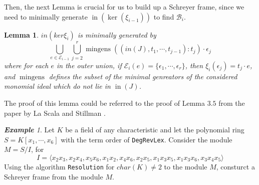 \documentclass{article}
\newtheorem{lemma}[theorem]{Lemma}
\newcommand{\initTerm}{\ensuremath{\operatorname{in}}}
\newcommand{\mingens}{\ensuremath{\operatorname{mingens}}}
\theoremstyle{definition}
\theoremstyle{remark}
\theoremstyle{example}
\newtheorem{example}{\textbf{Example}}[section]
\begin{document}

Then, the next Lemma is crucial for us to build up a Schreyer frame, since we need to minimally generate $\initTerm (\ker (\xi_{i-1}))$ to find $\mathcal{B}_i.$
\begin{lemma}\label{lem:mingens}
    $in(ker\xi_i)$ is minimally generated by
    \begin{equation}
        \bigcup_{e\in{\mathcal{E}}_{i-1}}{\bigcup_{j = 2}^{r}{\mingens((in(J),t_1,\cdots,t_{j-1}):t_j)\cdot \epsilon_j}}
    \end{equation}
    where for each $e$ in the outer union, if  $\mathcal{E}_i(e) = \{\epsilon_1,\cdots,\epsilon_r\}$, then $\xi_i(\epsilon_j) = t_{j} \cdot e$, and $\mingens$ defines the subset of the minimal genreators of the considered monomial ideal which do not lie in $\initTerm(J)$.
\end{lemma}

The proof of this lemma could be referred to the proof of Lemma $3.5$ from the paper by La Scala and Stillman \cite{la_scala_strategies_1998}.

\begin{example}
    Let $K$ be a field of any characteristic and let the polynomial ring $S = K[x_1,\cdots,x_6]$ with the term order of \verb+DegRevLex+. Consider the module $M = S/I$, for 
    \begin{equation}
        I = \langle x_2x_3,x_2x_4,x_5x_6,x_1x_2,x_4x_6,x_2x_5,x_1x_3x_5,x_1x_3x_6,x_3x_4x_5\rangle
    \end{equation} 
    Using the algorithm \verb+Resolution+ for $char(K) \neq 2$ to the module $M$, consturct a Schreyer frame from the module $M$.
\end{example}

\paragraph{  }
\end{document}
